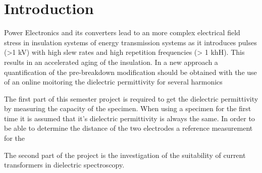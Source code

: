
\chapter{Introduction}
Power Electronics and its converters lead to an more complex electrical field stress in insulation systems of energy transmission systems as it introduces pulses (>1 kV) with high slew rates and high repetition frequencies (> 1 khH). This results in an accelerated aging of the insulation. In a new approach a quantification of the pre-breakdown modification should be obtained with the use of an online moitoring the dielectric permittivity for several harmonics %

The first part of this semester project is required to get the dielectric permittivity by measuring the capacity of the specimen. When using a specimen for the first time it is assumed that it's dielectric permittivity is always the same. In order to be able to determine the distance of the two electrodes a reference measurement for the 

The second part of the project is the investigation of the suitability of current transformers in dielectric spectroscopy. 

